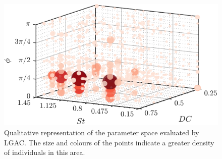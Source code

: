 \begin{figure}[t] %
    \centering
    \includegraphics[width=0.75\linewidth]{figures/F6.pdf}
    \caption{Qualitative representation of the parameter space evaluated by LGAC. The size and colours of the points indicate a greater density of individuals in this area.}
    \label{fig:param_groups}
\end{figure}

